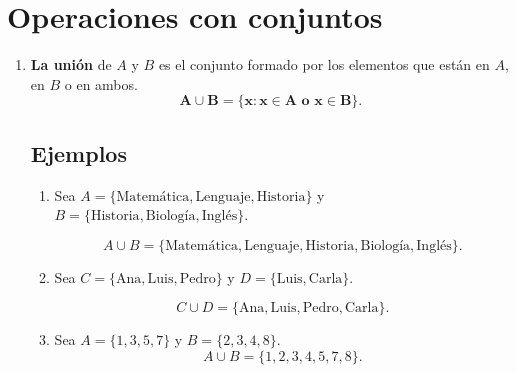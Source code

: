 \documentclass[12pt]{article}
\begin{document}
\section{Operaciones con conjuntos}
\begin{enumerate}
\item \textbf{La unión} de $A$ y $B$  es el conjunto formado por los elementos que están en $A$, en $B$ o en ambos.
$$\mathbf{A\cup B = \{x: x\in A \text{ o } x\in B\}}.$$
\begin{center}
\end{center}

\subsection*{Ejemplos}
\begin{enumerate}
    \item Sea \(A = \{\text{Matemática}, \text{Lenguaje}, \text{Historia}\}\)  
    y \(B = \{\text{Historia}, \text{Biología}, \text{Inglés}\}\).  
    
    \[
    A \cup B = \{\text{Matemática}, \text{Lenguaje}, \text{Historia}, \text{Biología}, \text{Inglés}\}.
    \]

    \item Sea \(C = \{\text{Ana}, \text{Luis}, \text{Pedro}\}\)  
    y \(D = \{\text{Luis}, \text{Carla}\}\).  

        \[
    C\cup D = \{\text{Ana}, \text{Luis}, \text{Pedro}, \text{Carla}\}.
    \]



    \item Sea \(A = \{1, 3, 5, 7\}\)  
    y \(B = \{2, 3, 4, 8\}\).  
   \[
    A \cup B = \{1, 2, 3, 4, 5, 7, 8\}.
    \]


\end{enumerate}
\end{enumerate}
\end{document}
